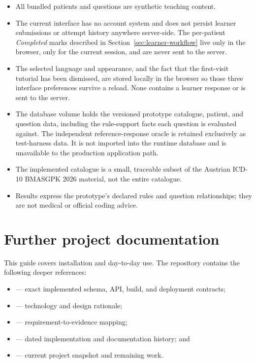 \documentclass[11pt,a4paper]{article}
\begin{document}
\begin{itemize}
  \item All bundled patients and questions are synthetic teaching content.
  \item The current interface has no account system and does not persist
        learner submissions or attempt history anywhere server-side. The
        per-patient \textit{Completed} marks described in
        Section~\ref{sec:learner-workflow} live only in the browser, only
        for the current session, and are never sent to the server.
  \item The selected language and appearance, and the fact that the
        first-visit tutorial has been dismissed, are stored locally in the
        browser so those three interface preferences survive a reload.
        None contains a learner response or is sent to the server.
  \item The database volume holds the versioned prototype catalogue,
        patient, and question data, including the rule-support facts each
        question is evaluated against. The independent reference-response
        oracle is retained exclusively as test-harness data. It is not
        imported into the runtime database and is unavailable to the
        production application path.
  \item The implemented catalogue is a small, traceable subset of the Austrian
        ICD-10 BMASGPK 2026 material, not the entire catalogue.
  \item Results express the prototype's declared rules and question
        relationships; they are not medical or official coding advice.
\end{itemize}

\section{Further project documentation}

This guide covers installation and day-to-day use. The repository contains
the following deeper references:

\begin{itemize}
  \item {} --- exact implemented
        schema, API, build, and deployment contracts;
  \item {} --- technology and design
        rationale;
  \item {} --- requirement-to-evidence
        mapping;
  \item {} --- dated implementation and documentation
        history; and
  \item {} --- current project snapshot and remaining work.
\end{itemize}
\end{document}
